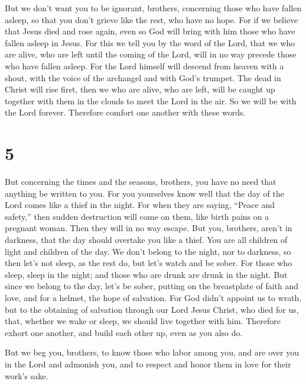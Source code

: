  But we don't want you to be ignorant, brothers, concerning
those who have fallen asleep, so that you don't grieve like the rest,
who have no hope.  For if we believe that Jesus died and
rose again, even so God will bring with him those who have fallen asleep
in Jesus.  For this we tell you by the word of the Lord,
that we who are alive, who are left until the coming of the Lord, will
in no way precede those who have fallen asleep.  For the
Lord himself will descend from heaven with a shout, with the voice of
the archangel and with God's trumpet. The dead in Christ will rise
first,  then we who are alive, who are left, will be caught
up together with them in the clouds to meet the Lord in the air. So we
will be with the Lord forever.  Therefore comfort one
another with these words.

\hypertarget{section-4}{%
\section{5}\label{section-4}}

 But concerning the times and the seasons, brothers, you
have no need that anything be written to you.  For you
yourselves know well that the day of the Lord comes like a thief in the
night.  For when they are saying, ``Peace and safety,'' then
sudden destruction will come on them, like birth pains on a pregnant
woman. Then they will in no way escape.  But you, brothers,
aren't in darkness, that the day should overtake you like a thief.
 You are all children of light and children of the day. We
don't belong to the night, nor to darkness,  so then let's
not sleep, as the rest do, but let's watch and be sober. 
For those who sleep, sleep in the night; and those who are drunk are
drunk in the night.  But since we belong to the day, let's
be sober, putting on the breastplate of faith and love, and for a
helmet, the hope of salvation.  For God didn't appoint us to
wrath, but to the obtaining of salvation through our Lord Jesus Christ,
 who died for us, that, whether we wake or sleep, we should
live together with him.  Therefore exhort one another, and
build each other up, even as you also do.

 But we beg you, brothers, to know those who labor among
you, and are over you in the Lord and admonish you,  and to
respect and honor them in love for their work's sake.

